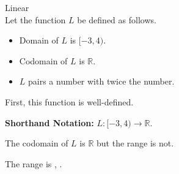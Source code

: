 \documentclass{ximera}
\begin{document}
\begin{example} Linear \\

Let the function $L$ be defined as follows.


\begin{itemize}
\item Domain of $L$ is $[-3, 4)$.
\item Codomain of $L$ is $\mathbb{R}$.
\item $L$ pairs a number with twice the number.
\end{itemize}


First, this function is well-defined. 


\textbf{Shorthand Notation: } $L: [-3, 4) \rightarrow \mathbb{R}$.

\begin{question}

The codomain of $L$ is $\mathbb{R}$ but the range is not.  

The range is \wordChoice{\choice{[}\choice{(}}  ,  \wordChoice{\choice{[}\choice{(}}.

\end{question}



\end{example}
\end{document}
